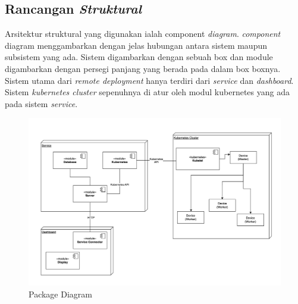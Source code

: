 \subsection{Rancangan \textit{Struktural}}
\label{subsec:arsitektur-struktural}

Arsitektur struktural yang digunakan ialah component \textit{diagram}. \textit{component} diagram menggambarkan dengan jelas hubungan antara sistem maupun subsistem yang ada. Sistem digambarkan dengan sebuah box dan module digambarkan dengan persegi panjang yang berada pada dalam box boxnya. Sistem utama dari \textit{remote deployment} hanya terdiri dari \textit{service} dan \textit{dashboard}. Sistem \textit{kubernetes cluster} sepenuhnya di atur oleh modul kubernetes yang ada pada sistem \textit{service}.

\begin{figure}[ht]
  \centering
  \includegraphics[width=1\textwidth]{resources/chapter-3/package-diagram.jpg}
  \caption{Package Diagram}
  \label{fig:package-diagram}
\end{figure}

